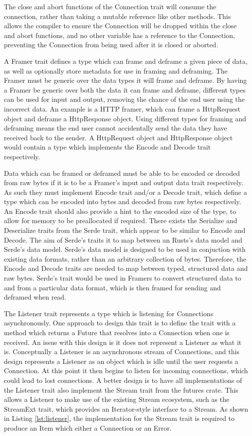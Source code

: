 \documentclass{l4proj}
\begin{document}
The close and abort functions of the Connection trait will consume the connection, rather than taking a mutable
reference like other methods.
This allows the compiler to ensure the Connection will be dropped within the close and abort functions, and no other
variable has a reference to the Connection, preventing the Connection from being used after it is closed or aborted.

A Framer trait defines a type which can frame and deframe a given piece of data, as well as optionally store metadata
for use in framing and deframing.
The Framer must be generic over the data types it will frame and deframe.
By having a Framer be generic over both the data it can frame and deframe, different types can be used for input and
output, removing the chance of the end user using the incorrect data.
An example is a HTTP framer, which can frame a HttpRequest object and deframe a HttpResponse object.
Using different types for framing and deframing means the end user cannot accidentally send the data they have received
back to the sender.
A HttpRequest object and HttpResponse object would contain a type which implements the Encode and Decode trait
respectively.

Data which can be framed or deframed must be able to be encoded or decoded from raw bytes if it is to be a Framer's
input and output data trait respectively.
As such they must implement Encode trait and/or a Decode trait, which define a type which can be encoded into bytes and
decoded from raw bytes respectively.
An Encode trait should also provide a hint to the encoded size of the type, to allow for memory to be preallocated if
required.
There exists the Serialize and Deserialize traits from the Serde trait, which appear to be similar to Encode and Decode.
The aim of Serde's traits it to map between an Rusts's data model and Serde's data model.
Serde's data model is designed to be used in conjuction with existing data formats, rather than an arbitrary collection
of bytes.
Therefore, the Encode and Decode traits are needed to map between typed, structured data and raw bytes.
Serde's trait would be used in Framers to convert structured data to and from a particular data format, which is then
framed for sending and deframed when read.

The Listener trait represents a type which is listening for Connections asynchronously.
One approach to design this trait is to define the trait with a method which returns a Future that resolves into a
Connection when one is received.
An issue with this design is it does not represent a Listener as what it is.
Conceptually a Listener is an asynchronous stream of Connections, and this design represents a Listener as an object
which is idle until the user requests a Connection.
At this point it then begins to listen for incoming connections, which could lead to lost connections.
A better design is to have all implementations of the Listener trait also implement the Stream trait from the futures
crate.
This allows a Listener to make use of the existing Stream ecosystem, such as the StreamExt trait, which provides an
Iterator-style interface to a Stream.
As shown in Listing \ref{lst:listener}, the implementation for the Stream trait is required to produce an Item which
either a Connection or an Error.
\end{document}
